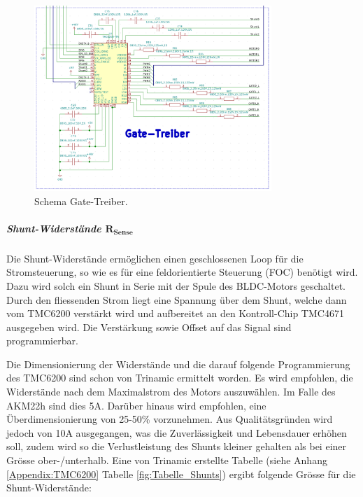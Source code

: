\begin{figure}[h!]
	\centering
	\includegraphics[width=0.8\textwidth]{graphics/Schema_Gate_Treiber}
	\caption{Schema Gate-Treiber.}
	\label{fig:Schema_Gate_Treiber}
\end{figure}

\newpage
\subparagraph{Shunt-Widerstände $\mathrm{\mathbf{R_{Sense}}}$}
Die Shunt-Widerstände ermöglichen einen geschlossenen Loop für die Stromsteuerung, so wie es für eine feldorientierte Steuerung (FOC) benötigt wird. Dazu wird solch ein Shunt in Serie mit der Spule des BLDC-Motors geschaltet. Durch den fliessenden Strom liegt eine Spannung über dem Shunt, welche dann vom TMC6200 verstärkt wird und aufbereitet an den Kontroll-Chip TMC4671 ausgegeben wird. Die Verstärkung sowie Offset auf das Signal sind programmierbar.

Die Dimensionierung der Widerstände und die darauf folgende Programmierung des TMC6200 sind schon von Trinamic ermittelt worden. Es wird empfohlen, die Widerstände nach dem Maximalstrom des Motors auszuwählen. Im Falle des AKM22h sind dies 5A. Darüber hinaus wird empfohlen, eine Überdimensionierung von 25-50\% vorzunehmen. Aus Qualitätsgründen wird jedoch von 10A ausgegangen, was die Zuverlässigkeit und Lebensdauer erhöhen soll, zudem wird so die Verlustleistung des Shunts kleiner gehalten als bei einer Grösse ober-/unterhalb. Eine von Trinamic erstellte Tabelle (siehe Anhang \ref{Appendix:TMC6200} Tabelle \ref{fig:Tabelle_Shunts}) ergibt folgende Grösse für die Shunt-Widerstände: \cite[S.31]{trinamic_tmc6200_datasheet_2013}

